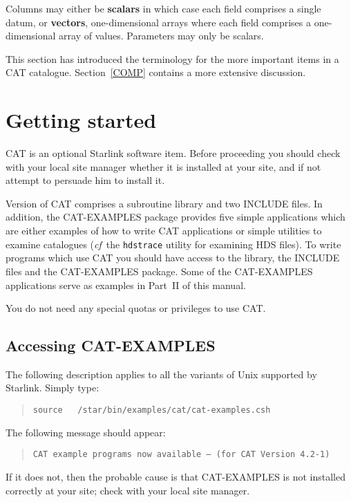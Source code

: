 Columns may either be {\bf scalars} in which case each field comprises
a single datum, or {\bf vectors}, one-dimensional arrays where each
field comprises a one-dimensional array of values. Parameters may only
be scalars.

This section has introduced the terminology for the more important
items in a CAT catalogue. Section~\ref{COMP} contains a more extensive
discussion.


\section{\label{START}Getting started}

CAT is an optional Starlink software item. Before proceeding you should
check with your local site manager whether it is installed at your site,
and if not attempt to persuade him to install it.

Version \CATversion of CAT comprises a subroutine library and two INCLUDE
files.  In addition, the CAT-EXAMPLES package provides five simple
applications which are either examples of how to write CAT applications
or simple utilities to examine catalogues ({\it cf}\, the {\tt hdstrace}
utility for examining HDS files). To write programs which use CAT you
should have access to the library, the INCLUDE files and the CAT-EXAMPLES
package.  Some of the CAT-EXAMPLES applications serve as examples in
Part~II of this manual.

You do not need any special quotas or privileges to use CAT.


\subsection{\label{ACCESS}Accessing CAT-EXAMPLES}

The following description applies to all the variants of Unix supported
by Starlink.  Simply type:

\begin{verse}
{\tt source ~ /star/bin/examples/cat/cat-examples.csh}
\end{verse}

The following message should appear:

\begin{verse}
{\tt CAT example programs now available -- (for CAT Version 4.2-1)} \\
\end{verse}

If it does not, then the probable cause is that CAT-EXAMPLES is not
installed correctly at your site; check with your local site manager.

